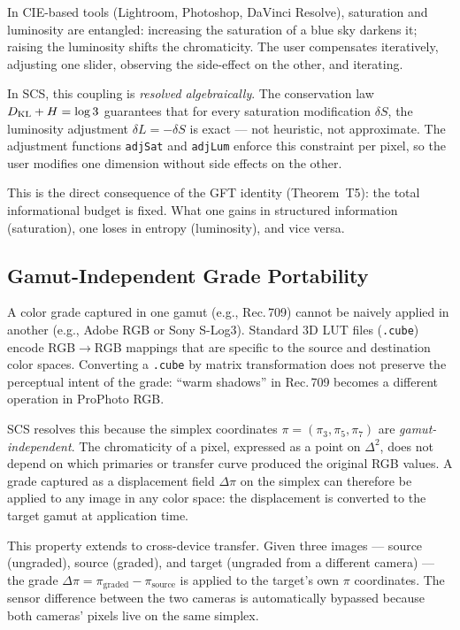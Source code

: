 \documentclass[12pt,a4paper]{article}
\begin{document}
In CIE-based tools (Lightroom, Photoshop, DaVinci Resolve), saturation
and luminosity are entangled: increasing the saturation of a blue sky
darkens it; raising the luminosity shifts the chromaticity. The user
compensates iteratively, adjusting one slider, observing the side-effect
on the other, and iterating.

In SCS, this coupling is \emph{resolved algebraically}. The
conservation law $D_{\mathrm{KL}} + H = \log 3$ guarantees that for every
saturation modification $\delta S$, the luminosity adjustment
$\delta L = -\delta S$ is exact --- not heuristic, not approximate.
The adjustment functions \texttt{adjSat} and \texttt{adjLum} enforce
this constraint per pixel, so the user modifies one dimension without
side effects on the other.

This is the direct consequence of the GFT identity (Theorem~T5):
the total informational budget is fixed. What one gains in structured
information (saturation), one loses in entropy (luminosity), and
vice versa.

\subsection{Gamut-Independent Grade Portability}

A color grade captured in one gamut (e.g., Rec.\,709) cannot be
naively applied in another (e.g., Adobe RGB or Sony S-Log3). Standard
3D LUT files (\texttt{.cube}) encode RGB$\to$RGB mappings that are
specific to the source and destination color spaces. Converting a
\texttt{.cube} by matrix transformation does not preserve the
perceptual intent of the grade: ``warm shadows'' in Rec.\,709 becomes
a different operation in ProPhoto RGB.

SCS resolves this because the simplex coordinates
$\pi = (\pi_3, \pi_5, \pi_7)$ are \emph{gamut-independent}. The
chromaticity of a pixel, expressed as a point on $\Delta^2$, does not
depend on which primaries or transfer curve produced the original RGB
values. A grade captured as a displacement field $\Delta\pi$ on the
simplex can therefore be applied to any image in any color space: the
displacement is converted to the target gamut at application time.

This property extends to cross-device transfer. Given three images ---
source (ungraded), source (graded), and target (ungraded from a
different camera) --- the grade $\Delta\pi = \pi_\mathrm{graded} -
\pi_\mathrm{source}$ is applied to the target's own $\pi$ coordinates.
The sensor difference between the two cameras is automatically bypassed
because both cameras' pixels live on the same simplex.
\end{document}
